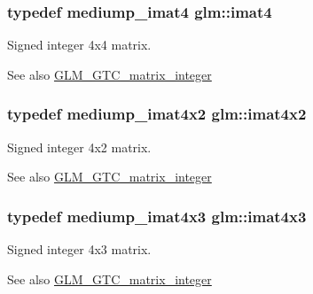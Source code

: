 \subsubsection[{imat4}]{\setlength{\rightskip}{0pt plus 5cm}typedef mediump\+\_\+imat4 {\bf glm\+::imat4}}\label{group__gtc__matrix__integer_ga40fc5c5e0b07543497aa1c314891544a}
Signed integer 4x4 matrix. \begin{DoxySeeAlso}{See also}
\hyperlink{group__gtc__matrix__integer}{G\+L\+M\+\_\+\+G\+T\+C\+\_\+matrix\+\_\+integer} 
\end{DoxySeeAlso}
\hypertarget{group__gtc__matrix__integer_ga7e733984837e0e7aa9f4aac18f632f63}{}
\subsubsection[{imat4x2}]{\setlength{\rightskip}{0pt plus 5cm}typedef mediump\+\_\+imat4x2 {\bf glm\+::imat4x2}}\label{group__gtc__matrix__integer_ga7e733984837e0e7aa9f4aac18f632f63}
Signed integer 4x2 matrix. \begin{DoxySeeAlso}{See also}
\hyperlink{group__gtc__matrix__integer}{G\+L\+M\+\_\+\+G\+T\+C\+\_\+matrix\+\_\+integer} 
\end{DoxySeeAlso}
\hypertarget{group__gtc__matrix__integer_gaa4cca8e80c0603239eda452860063844}{}
\subsubsection[{imat4x3}]{\setlength{\rightskip}{0pt plus 5cm}typedef mediump\+\_\+imat4x3 {\bf glm\+::imat4x3}}\label{group__gtc__matrix__integer_gaa4cca8e80c0603239eda452860063844}
Signed integer 4x3 matrix. \begin{DoxySeeAlso}{See also}
\hyperlink{group__gtc__matrix__integer}{G\+L\+M\+\_\+\+G\+T\+C\+\_\+matrix\+\_\+integer} 
\end{DoxySeeAlso}
\hypertarget{group__gtc__matrix__integer_ga367d8d5281ff82f1215a227dd2ea5ba9}{}
